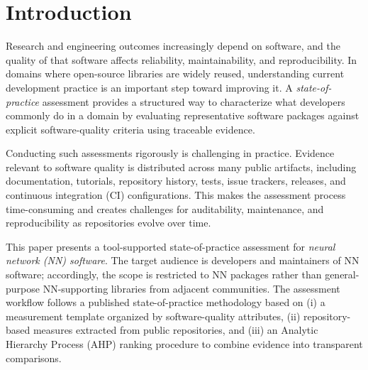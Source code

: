 \documentclass[final,1p,times,authoryear,12pt]{elsarticle}
\providecommand{\wss}[1]{\textcolor{blue}{\textit{#1}}}
\begin{document}
\section{Introduction}\label{introduction}




Research and engineering outcomes increasingly depend on
software, and the quality of that software affects
reliability, maintainability, and reproducibility. In domains
where open-source libraries are widely reused, understanding
current development practice is an important step toward
improving it. A \emph{state-of-practice} assessment provides
a structured way to characterize what developers commonly do
in a domain by evaluating representative software packages
against explicit software-quality criteria using traceable
evidence.

Conducting such assessments rigorously is challenging in
practice. Evidence relevant to software quality is
distributed across many public artifacts, including
documentation, tutorials, repository history, tests, issue
trackers, releases, and continuous integration (CI)
configurations. This makes the assessment process
time-consuming and creates challenges for auditability,
maintenance, and reproducibility as repositories evolve over
time.

This paper presents a tool-supported state-of-practice assessment for \emph{neural network (NN) software}.
The target audience is developers and maintainers of NN software; accordingly, the scope is restricted to NN packages rather than
general-purpose NN-supporting libraries from adjacent communities. The assessment workflow follows a published state-of-practice
methodology based on (i) a measurement template organized by software-quality attributes, (ii) repository-based measures extracted
from public repositories, and (iii) an Analytic Hierarchy Process (AHP) ranking procedure to combine evidence into transparent
comparisons.
\end{document}
